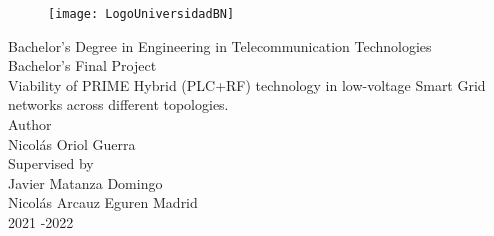 	\begin{titlepage}
		\begin{figure}
			\centering
			\texttt{[image: LogoUniversidadBN]}
		\end{figure}
		\centering
		\Large Bachelor's Degree in Engineering in Telecommunication Technologies \\ 
		\vspace*{2em} %
		\centering
		Bachelor's Final Project \\ 
		\vspace*{4em}
		Viability of PRIME Hybrid (PLC+RF) technology in low-voltage Smart Grid networks across different topologies.
        \\ \large
		\vspace*{6em}
		Author \\ Nicolás Oriol Guerra \\ 
		\vspace*{1em}
		Supervised by \\ Javier Matanza Domingo \\ Nicolás Arcauz Eguren %
		\vfill
		Madrid  \\
		2021 -2022
	\end{titlepage}